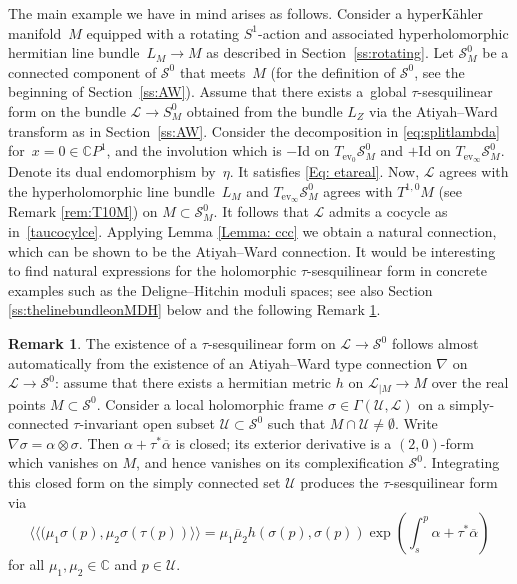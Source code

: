 \documentclass[pdftex]{sigma}
\numberwithin{equation}{section}
\theoremstyle{definition}
\newtheorem{Remark}[Theorem]{Remark}
\newcommand\C{{\mathbb C}}
\begin{document}
The main example we have in mind arises as follows. Consider a hyperK\"ahler manifold~$M$ equipped with a rotating $S^1$-action and associated hyperholomorphic hermitian line bundle~${L_M \longrightarrow M}$ as described in Section~\ref{ss:rotating}. Let $\mathcal S^0_M$ be a connected component of $\mathcal S^0$ that meets~$M$ (for the definition of $\mathcal S^0$, see the beginning of Section~\ref{ss:AW}). Assume that there exists a~global $\tau$-sesquilinear form on the bundle
$\mathcal L \longrightarrow S^0_M$ obtained from the bundle $L_Z$ via the Atiyah--Ward transform as in Section~\ref{ss:AW}.
Consider the decomposition in \eqref{eq:splitlambda} for~${x = 0 \in \C P^1}$,
and the involution which is $-$Id on $T_{\text{ev}_0}\mathcal S^0_M$ and $+$Id on
$T_{\text{ev}_\infty}\mathcal S^0_M$.
Denote its dual endomorphism by~$\eta$. It satisfies \eqref{Eq: etareal}.
Now, $\mathcal L$ agrees with the hyperholomorphic line bundle~$L_M$ and $T_{\text{ev}_\infty}\mathcal S^0_M$ agrees with $T^{1,0}M$ (see Remark \ref{rem:T10M}) on $M\subset \mathcal S^0_M$. It follows that $\mathcal L$ admits a cocycle as in~\eqref{taucocylce}.
Applying Lemma \ref{Lemma: ccc} we obtain a natural connection, which
can be shown to be the Atiyah--Ward connection.
It would be interesting to find natural expressions for the holomorphic
$\tau$-sesquilinear form in concrete examples such as the Deligne--Hitchin moduli spaces;
see also Section \ref{ss:thelinebundleonMDH} below and the following Remark \ref{re6}.

\begin{Remark}\label{re6}
The existence of a $\tau$-sesquilinear form on $\mathcal L \longrightarrow \mathcal S^0$
follows almost
automatically from the existence of an Atiyah--Ward type connection $\nabla$ on
$\mathcal L \longrightarrow \mathcal S^0$: assume that there exists a hermitian metric $h$ on
$\mathcal L_{\mid
M} \longrightarrow M$ over the real points $M \subset \mathcal S^0.$ Consider a local
holomorphic frame
$\sigma \in \Gamma(\mathcal U, \mathcal L)$ on a simply-connected $\tau$-invariant open subset
$\mathcal U \subset \mathcal S^0$ such that $M \cap \mathcal U \not= \emptyset$. Write $\nabla
\sigma = \alpha\otimes\sigma.$ Then
$\alpha+\tau^*\overline{\alpha}$ is closed; its exterior derivative is a $(2,0)$-form
which vanishes on $M$, and hence vanishes on its complexification $\mathcal S^0$. Integrating this closed
form on the simply connected set $\mathcal U$ produces the $\tau$-sesquilinear form
via
\[\langle\langle(\mu_1\sigma(p), \mu_2\sigma(\tau(p))\rangle\rangle =
\mu_1\overline\mu_2 h(\sigma(p), \sigma(p))\exp\left(\int_s^p\alpha+\tau^*\overline{\alpha}\right)\]
for all $\mu_1, \mu_2 \in \C$ and $p \in \mathcal U$.
\end{Remark}
\end{document}
